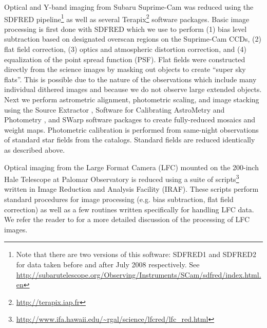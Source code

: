 \documentclass[a4paper,fleqn,usenatbib]{mnras}
\begin{document}
Optical and Y-band imaging from Subaru Suprime-Cam was reduced using the SDFRED pipeline\footnote{Note that there are two versions of this software: SDFRED1 and SDFRED2 for data taken before and after July 2008 respectively. See \url{http://subarutelescope.org/Observing/Instruments/SCam/sdfred/index.html.en}} \citep{Ouchi2004} as well as several Terapix\footnote{\url{http://terapix.iap.fr}} software packages.
Basic image processing is first done with SDFRED which we use to perform (1) bias level subtraction based on designated overscan regions on the Suprime-Cam CCDs, (2) flat field correction,
(3) optics and atmospheric distortion correction, and (4) equalization of the point spread function (PSF).
Flat fields were constructed directly from the science images by masking out objects to create ``super sky flats''.
This is possible due to the nature of the observations which include many individual dithered images and because we do not observe large extended objects.
Next we perform astrometric alignment, photometric scaling, and image stacking using the Source Extractor \citep[SExtractor:][]{Bertin1996}, Software for Calibrating AstroMetry and Photometry \cite[SCAMP:][]{Bertin2006}, and SWarp \citep{Bertin2002} software packages to create fully-reduced mosaics and weight maps.
Photometric calibration is performed from same-night observations of standard star fields from the \citet{Landolt1992} catalogs. 
Standard fields are reduced identically as described above.


Optical imaging from the Large Format Camera (LFC) mounted on the 200-inch Hale Telescope at Palomar Observatory is reduced using a suite of scripts\footnote{\url{http://www.ifa.hawaii.edu/~rgal/science/lfcred/lfc_red.html}} written in Image Reduction and Analysis Facility (IRAF).
These scripts perform standard procedures for image processing (e.g. bias subtraction, flat field correction) as well as a few routines written specifically for handling LFC data.
We refer the reader to \citet{Gal2005} for a more detailed discussion of the processing of LFC images.
\end{document}
